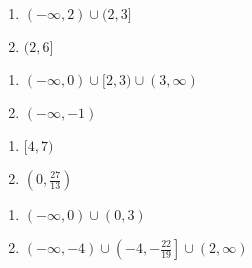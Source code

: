 \documentclass{ximera}
\begin{document}
\begin{multicols}{2}
\begin{enumerate}
\setcounter{enumi}{\value{HW}}

\item  $(-\infty, 2) \cup (2,3]$
\item  $(2,6]$

\setcounter{HW}{\value{enumi}}
\end{enumerate}
\end{multicols}

\begin{multicols}{2}
\begin{enumerate}
\setcounter{enumi}{\value{HW}}

\item $(-\infty, 0) \cup [2,3) \cup (3, \infty)$
\item $(-\infty, -1)$  


\setcounter{HW}{\value{enumi}}
\end{enumerate}
\end{multicols}

\begin{multicols}{2}
\begin{enumerate}
\setcounter{enumi}{\value{HW}}

\item $[4,7)$  
\item $\left(0, \frac{27}{13} \right)$

\setcounter{HW}{\value{enumi}}
\end{enumerate}
\end{multicols}

\begin{multicols}{2}
\begin{enumerate}
\setcounter{enumi}{\value{HW}}
\item $(-\infty, 0) \cup (0,3)$   \vphantom{$(-\infty, -4) \cup \left(-4, -\frac{22}{19}\right] \cup (2, \infty)$}
\item $(-\infty, -4) \cup \left(-4, -\frac{22}{19}\right] \cup (2, \infty)$

\setcounter{HW}{\value{enumi}}
\end{enumerate}
\end{multicols}
\end{document}
